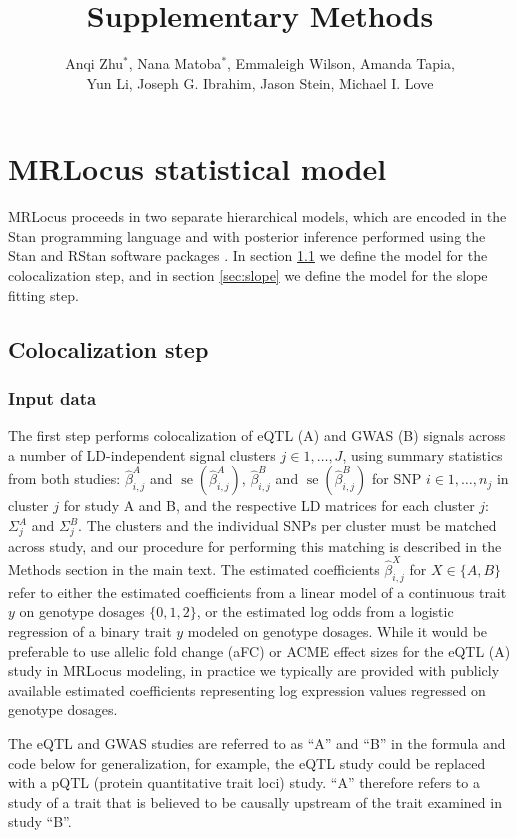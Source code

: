 \documentclass[11pt]{article}
\title{Supplementary Methods}
\author{Anqi Zhu$^*$, Nana Matoba$^*$, Emmaleigh Wilson, Amanda Tapia,
  \\ Yun Li, Joseph G. Ibrahim, Jason Stein, Michael I. Love}
\DeclareMathOperator{\se}{\textrm{se}}
\begin{document}
\maketitle
\section{MRLocus statistical model}

MRLocus proceeds in two separate hierarchical models, which are
encoded in the Stan programming language and with posterior
inference performed using the Stan and RStan software packages
\citep{stan,rstan}. In section \ref{sec:coloc} we define the
model for the colocalization step, and in section \ref{sec:slope} we
define the model for the slope fitting step.

\subsection{Colocalization step} \label{sec:coloc}

\subsubsection{Input data}

The first step performs colocalization of eQTL (A) and GWAS (B)
signals across a number of LD-independent signal clusters
$j \in 1,\dots,J$, using summary statistics from both studies:
$\widehat{\beta}^A_{i,j}$ and $\se(\widehat{\beta}^A_{i,j})$,
$\widehat{\beta}^B_{i,j}$ and $\se(\widehat{\beta}^B_{i,j})$
for SNP $i \in 1,\dots,n_j$ in cluster $j$ for study A and B,
and the respective LD matrices for each cluster $j$:
$\Sigma_j^A$ and $\Sigma_j^B$.
The clusters and the individual SNPs per cluster must be matched across
study, and our procedure for performing this matching is described in
the Methods section in the main text.
The estimated coefficients $\widehat{\beta}^X_{i,j}$ for
$X \in \{A,B\}$ refer to either the estimated coefficients from a
linear model of a continuous trait $y$ on genotype dosages
$\{0,1,2\}$, or the estimated log odds from a logistic regression of a
binary trait $y$ modeled on genotype dosages. While it would be
preferable to use allelic fold change (aFC) \citep{aFC} or ACME effect sizes
\citep{ACME} for the eQTL (A) study in MRLocus modeling, in practice
we typically are provided with publicly available estimated
coefficients representing log expression values regressed on genotype
dosages.

The eQTL and GWAS studies are referred to as ``A'' and ``B'' in the
formula and code below for generalization, for example, the eQTL study
could be replaced with a pQTL (protein quantitative trait loci)
study. ``A'' therefore refers to a study of a trait that is believed
to be causally upstream of the trait examined in study ``B''.
\end{document}
